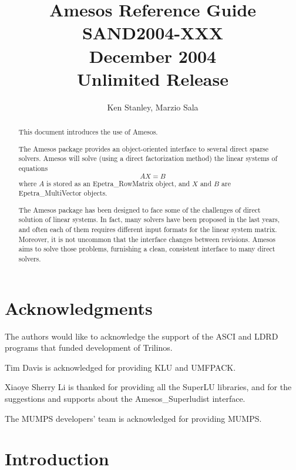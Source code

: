 \documentclass[11pt,letter]{article}
\author{Ken Stanley, Marzio Sala
}
\title{Amesos Reference Guide \\
   SAND2004-XXX \\
December 2004 \\
Unlimited Release}
\newcommand{\Amesos}{Amesos}
\begin{document}
\maketitle

\begin{abstract}
  
  This document introduces the use of \Amesos{}.
  
  The Amesos package provides an object-oriented interface to several
  direct sparse solvers. Amesos will solve (using a direct factorization
  method) the linear systems of equations
  \begin{equation}
    \label{eq:linear_system}
    A X = B
  \end{equation}
  where $A$ is stored as an Epetra\_RowMatrix object, and $X$ and $B$ are
  Epetra\_MultiVector objects.

  The Amesos package has been designed to face some of the challenges of
  direct solution of linear systems. In fact, many solvers have been
  proposed in the last years, and often each of them requires different
  input formats for the linear system matrix. Moreover, it is not uncommon
  that the interface changes between revisions. Amesos aims to solve those
  problems, furnishing a clean, consistent interface to many direct
  solvers.
  
\end{abstract}

\clearpage
\section*{Acknowledgments}
The authors would like to acknowledge the support of the ASCI and LDRD programs
that funded development of Trilinos.

\smallskip

Tim Davis is acknowledged for providing KLU and UMFPACK.

\smallskip

Xiaoye Sherry Li is thanked for providing all the SuperLU libraries, and
for the suggestions and supports about the Amesos\_Superludist
interface.

\smallskip

The MUMPS developers' team is acknowledged for providing MUMPS.

\clearpage

\tableofcontents

\clearpage

\section{Introduction}
\end{document}
